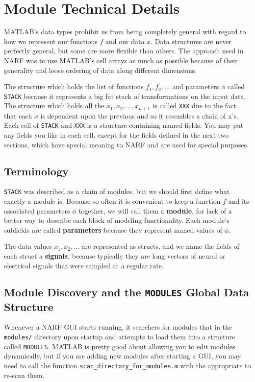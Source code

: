 \documentclass[letterpaper]{report}
\newcommand{\definition}[1]{\textbf{#1}}
\newcommand{\matlab}[1]{\texttt{#1}}
\begin{document}
\section{Module Technical Details}

MATLAB's data types prohibit us from being completely general with regard to how we represent our functions $f$ and our data $x$. Data structures are never perfectly general, but some are more flexible than others. The approach used in NARF was to use MATLAB's cell arrays as much as possible because of their generality and loose ordering of data along different dimensions. 

The structure which holds the list of functions $f_1, f_2, ...$ and parameters $\phi$ called \matlab{STACK} because it represents a big fat stack of transformations on the input data. The structure which holds all the $x_1, x_2, ..., x_{n+1}$ is called \matlab{XXX} due to the fact that each $x$ is dependent upon the previous and so it resembles a chain of x's. Each cell of \matlab{STACK} and \matlab{XXX} is a structure containing named fields. You may put any fields you like in each cell, except for the fields defined in the next two sections, which have special meaning to NARF and are used for special purposes. 

\subsection{Terminology}

\matlab{STACK} was described as a chain of modules, but we should first define what exactly a module is. Because so often it is convenient to keep a function $f$ and its associated parameters $\phi$ together, we will call them a \definition{module}, for lack of a better way to describe each block of modeling functionality. Each module's subfields are called \definition{parameters} because they represent named values of $\phi$. 

The data values $x_1, x_2, ...$ are represented as structs, and we name the fields of each struct a \definition{signals}, because typically they are long vectors of neural or electrical signals that were sampled at a regular rate. 

\subsection{Module Discovery and the \matlab{MODULES} Global Data Structure}

Whenever a NARF GUI starts running, it searchers for modules that in the \matlab{modules/} directory upon startup and attempts to load them into a structure called \matlab{MODULES}. MATLAB is pretty good about allowing you to edit modules dynamically, but if you are adding new modules after starting a GUI, you may need to call the function \matlab{scan\_directory\_for\_modules.m} with the appropriate to re-scan them. 
\end{document}
